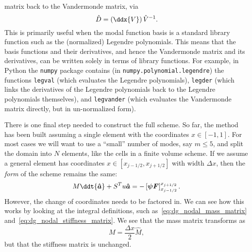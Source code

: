 matrix back to the Vandermonde matrix, via
%
\begin{equation}
  \label{eq:dg_nodal_D_matrix_from_V}
  \hat{D} = \left( \ddx{V} \right) \hat{V}^{-1}.
\end{equation}
%
This is primarily useful when the modal function basis is a standard library
function such as the (normalized) Legendre polynomials. This means that the
basis functions and their derivatives, and hence the Vandermonde matrix and its
derivatives, can be written solely in terms of library functions. For example,
in Python the \texttt{numpy} package contains (in \texttt{numpy.polynomial.legendre})
the functions \texttt{legval} (which evaluates the Legendre polynomials),
\texttt{legder} (which links the derivatives of the Legendre polynomials back to
the Legendre polynomials themselves), and \texttt{legvander} (which evaluates
the Vandermonde matrix directly, but in un-normalized form).

There is one final step needed to construct the full scheme. So far, the method
has been built assuming a single element with the coordinates $x \in [-1, 1]$.
For most cases we will want to use a ``small'' number of modes, say $m \le 5$,
and split the domain into $N$ elements, like the cells in a finite volume scheme.
If we assume a general element has coordinates $x \in [x_{j-1/2}, x_{j+1/2}]$
with width $\Delta x$, then the \emph{form} of the scheme remains the same:
%
\begin{equation}
  \label{eq:dg_nodal_final}
  M \ddt{\bm{\hat{a}}} + S^T u \bm{\hat{a}} = -\left[ \bm{\psi F} \right]_{x_{j-1/2}}^{x_{j+1/2}}.
\end{equation}
%
However, the change of coordinates needs to be factored in. We can see how this
works by looking at the integral definitions, such as~\eqref{eq:dg_nodal_mass_matrix}
and~\eqref{eq:dg_nodal_stiffness_matrix}. We see that the mass matrix transforms
as
%
\begin{equation}
  \label{eq:dg_nodal_mass_matrix_with_h}
  M = \frac{\Delta x}{2} \hat{M},
\end{equation}
%
but that the stiffness matrix is unchanged.


